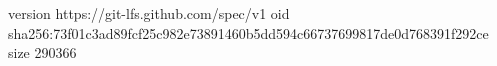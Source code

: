 version https://git-lfs.github.com/spec/v1
oid sha256:73f01c3ad89fcf25c982e73891460b5dd594c66737699817de0d768391f292ce
size 290366
